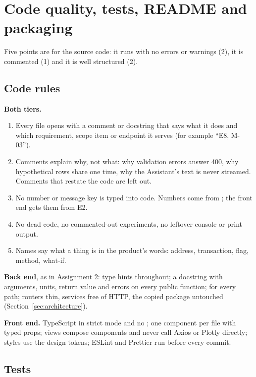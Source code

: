 \section{Code quality, tests, README and packaging}
\label{sec:quality}

Five points are for the source code: it runs with no errors or warnings (2), it is commented (1)
and it is well structured (2).

\subsection{Code rules}
\label{sec:coderules}

\textbf{Both tiers.}
\begin{enumerate}
  \item Every file opens with a comment or docstring that says what it does and which requirement,
    scope item or endpoint it serves (for example ``E8, M-03'').
  \item Comments explain why, not what: why validation errors answer 400, why hypothetical rows
    share one time, why the Assistant's text is never streamed. Comments that restate the code are
    left out.
  \item No number or message key is typed into code. Numbers come from ; the
    front end gets them from E2.
  \item No dead code, no commented-out experiments, no leftover console or print output.
  \item Names say what a thing is in the product's words: address, transaction, flag, method,
    what-if.
\end{enumerate}

\textbf{Back end}, as in Assignment 2: type hints throughout; a docstring with arguments, units,
return value and errors on every public function;  for every path; routers thin,
services free of HTTP, the copied package untouched (Section~\ref{sec:architecture}).

\textbf{Front end.} TypeScript in strict mode and no ; one component per file with
typed props; views compose components and never call Axios or Plotly directly; styles use the
design tokens; ESLint and Prettier run before every commit.

\subsection{Tests}
\label{sec:tests}

